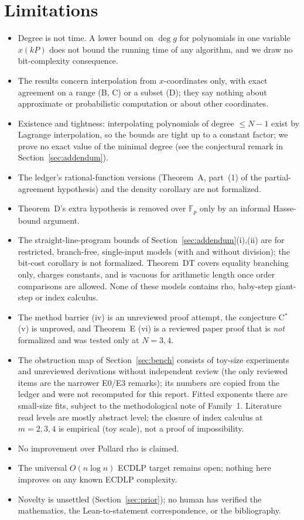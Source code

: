 \documentclass[11pt,a4paper]{article}
\theoremstyle{remark}
\newcommand{\F}{\mathbb{F}}
\begin{document}
\section{Limitations}\label{sec:limits}
\begin{itemize}
\item Degree is not time. A lower bound on $\deg g$ for polynomials in one variable $x(kP)$ does not bound the running time of any algorithm, and we draw no bit-complexity consequence.
\item The results concern interpolation from $x$-coordinates only, with exact agreement on a range (B, C) or a subset (D); they say nothing about approximate or probabilistic computation or about other coordinates.
\item Existence and tightness: interpolating polynomials of degree $\le N-1$ exist by Lagrange interpolation, so the bounds are tight up to a constant factor; we prove no exact value of the minimal degree (see the conjectural remark in Section~\ref{sec:addendum}).
\item The ledger's rational-function versions (Theorem~A, part~(1) of the partial-agreement hypothesis) and the density corollary are not formalized.
\item Theorem~D's extra hypothesis is removed over $\F_p$ only by an informal Hasse-bound argument.
\item The straight-line-program bounds of Section~\ref{sec:addendum}(i),(ii) are for restricted, branch-free, single-input models (with and without division); the bit-cost corollary is not formalized. Theorem~DT covers equality branching only, charges constants, and is vacuous for arithmetic length once order comparisons are allowed. None of these models contains rho, baby-step giant-step or index calculus.
\item The method barrier (iv) is an unreviewed proof attempt, the conjecture C$^*$ (v) is unproved, and Theorem~E (vi) is a reviewed paper proof that is \emph{not} formalized and was tested only at $N=3,4$.
\item The obstruction map of Section~\ref{sec:bench} consists of toy-size experiments and unreviewed derivations without independent review (the only reviewed items are the narrower E0/E3 remarks); its numbers are copied from the ledger and were not recomputed for this report. Fitted exponents there are small-size fits, subject to the methodological note of Family~1. Literature read levels are mostly abstract level; the closure of index calculus at $m=2,3,4$ is empirical (toy scale), not a proof of impossibility.
\item No improvement over Pollard rho is claimed.
\item The universal $O(n\log n)$ ECDLP target remains open; nothing here improves on any known ECDLP complexity.
\item Novelty is unsettled (Section~\ref{sec:prior}); no human has verified the mathematics, the Lean-to-statement correspondence, or the bibliography.
\end{itemize}
\end{document}
